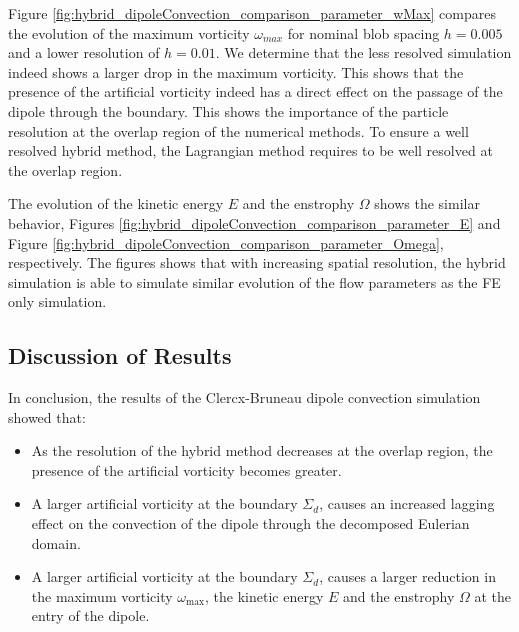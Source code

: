
Figure \ref{fig:hybrid_dipoleConvection_comparison_parameter_wMax} compares the evolution of the maximum vorticity $\omega_{max}$ for nominal blob spacing $h=0.005$ and a lower resolution of $h=0.01$. We determine that the less resolved simulation indeed shows a larger drop in the maximum vorticity. This shows that the presence of the artificial vorticity indeed has a direct effect on the passage of the dipole through the boundary. This shows the importance of the particle resolution at the overlap region of the numerical methods. To ensure a well resolved hybrid method, the Lagrangian method requires to be well resolved at the overlap region.

The evolution of the kinetic energy $E$ and the enstrophy $\Omega$ shows the similar behavior, Figures \ref{fig:hybrid_dipoleConvection_comparison_parameter_E} and Figure \ref{fig:hybrid_dipoleConvection_comparison_parameter_Omega}, respectively. The figures shows that with increasing spatial resolution, the hybrid simulation is able to simulate similar evolution of the flow parameters as the FE only simulation.


\subsection{Discussion of Results}

In conclusion, the results of the Clercx-Bruneau dipole convection simulation showed that:
\begin{itemize}
\item As the resolution of the hybrid method decreases at the overlap region, the presence of the artificial vorticity becomes greater.
\item A larger artificial vorticity at the boundary $\Sigma_d$, causes an increased lagging effect on the convection of the dipole through the decomposed Eulerian domain.
\item A larger artificial vorticity at the boundary $\Sigma_d$, causes a larger reduction in the maximum vorticity $\omega_{\mathrm{max}}$, the kinetic energy $E$ and the enstrophy $\Omega$ at the entry of the dipole.
\end{itemize}

